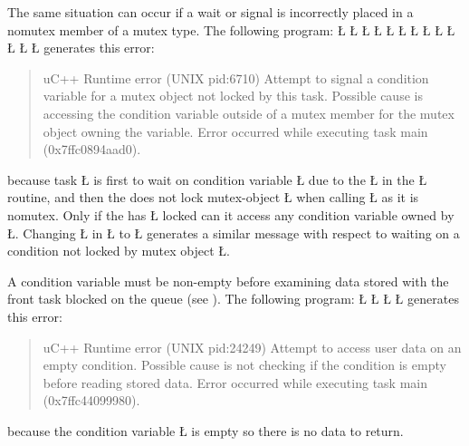 \documentclass[openright,twoside]{report}
\begin{document}
The same situation can occur if a wait or signal is incorrectly placed in a nomutex member of a mutex type.
The following program:
\LGinlinefalse\LGbegin\lgrinde
\L{}
\L{\LB{}}
\L{\LB{}}
\L{}
\L{\LB{}}
\L{\LB{}}
\L{\LB{}}
\L{\LB{\};}}
\endlgrinde\LGend
\LGinlinefalse\LGbegin\lgrinde
\L{}
\L{\LB{}}
\L{\LB{}}
\L{\LB{}}
\L{\LB{\}}}
\endlgrinde\LGend
generates this error:
\begin{quote}
\BGfont
uC++ Runtime error (UNIX pid:6710) Attempt to signal a condition variable for a mutex object not locked by this task.
Possible cause is accessing the condition variable outside of a mutex member for the mutex object owning the variable.
Error occurred while executing task main (0x7ffc0894aad0).
\end{quote}
because task \LGinlinetrue\LGbegin\lgrinde\L{}\endlgrinde\LGend{} is first to wait on condition variable \LGinlinetrue\LGbegin\lgrinde\L{}\endlgrinde\LGend{} due to the \LGinlinetrue\LGbegin\lgrinde\L{}\endlgrinde\LGend{} in the \LGinlinetrue\LGbegin\lgrinde\L{}\endlgrinde\LGend{} routine, and then the  does not lock mutex-object \LGinlinetrue\LGbegin\lgrinde\L{}\endlgrinde\LGend{} when calling \LGinlinetrue\LGbegin\lgrinde\L{}\endlgrinde\LGend{} as it is nomutex.
Only if the  has \LGinlinetrue\LGbegin\lgrinde\L{}\endlgrinde\LGend{} locked can it access any condition variable owned by \LGinlinetrue\LGbegin\lgrinde\L{}\endlgrinde\LGend{}.
Changing \LGinlinetrue\LGbegin\lgrinde\L{}\endlgrinde\LGend{} in \LGinlinetrue\LGbegin\lgrinde\L{}\endlgrinde\LGend{} to \LGinlinetrue\LGbegin\lgrinde\L{}\endlgrinde\LGend{} generates a similar message with respect to waiting on a condition not locked by mutex object \LGinlinetrue\LGbegin\lgrinde\L{}\endlgrinde\LGend{}.

A condition variable must be non-empty before examining data stored with the front task blocked on the queue (see ).
The following program:
\LGinlinefalse\LGbegin\lgrinde
\L{}
\L{\LB{}}
\L{\LB{}}
\L{\LB{\}}}
\endlgrinde\LGend
generates this error:
\begin{quote}
\BGfont
uC++ Runtime error (UNIX pid:24249) Attempt to access user data on an empty condition.
Possible cause is not checking if the condition is empty before reading stored data.
Error occurred while executing task main (0x7ffc44099980).
\end{quote}
because the condition variable \LGinlinetrue\LGbegin\lgrinde\L{}\endlgrinde\LGend{} is empty so there is no data to return.
\end{document}
